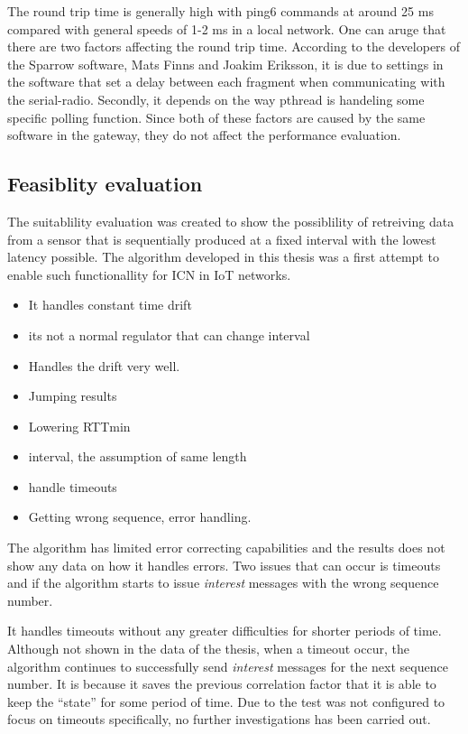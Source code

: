 The round trip time is generally high with ping6 commands at around 25 ms compared with general speeds of 1-2 ms in a local network. One can aruge that there are two factors affecting the round trip time. According to the developers of the Sparrow software, Mats Finns and Joakim Eriksson, it is due to settings in the software that set a delay between each fragment when communicating with the serial-radio. Secondly, it depends on the way pthread is handeling some specific polling function. Since both of these factors are caused by the same software in the gateway, they do not affect the performance evaluation.

\subsection{Feasiblity evaluation}
The suitablility evaluation was created to show the possiblility of retreiving data from a sensor that is sequentially produced at a fixed interval with the lowest latency possible. The algorithm developed in this thesis was a first attempt to enable such functionallity for ICN in IoT networks.

\begin{itemize}
\item It handles constant time drift
\item its not a normal regulator that can change interval
\item Handles the drift very well.
\end{itemize}

\begin{itemize}
\item Jumping results
\item Lowering RTTmin
\item interval, the assumption of same length
\end{itemize}

\begin{itemize}
\item handle timeouts
\item Getting wrong sequence, error handling.
\end{itemize}

The algorithm has limited error correcting capabilities and the results does not show any data on how it handles errors. Two issues that can occur is timeouts and if the algorithm starts to issue \textit{interest} messages with the wrong sequence number. 

It handles timeouts without any greater difficulties for shorter periods of time. Although not shown in the data of the thesis, when a timeout occur, the algorithm continues to successfully send \textit{interest} messages for the next sequence number. It is because it saves the previous correlation factor that it is able to keep the ``state'' for some period of time. Due to the test was not configured to focus on timeouts specifically, no further investigations has been carried out.

